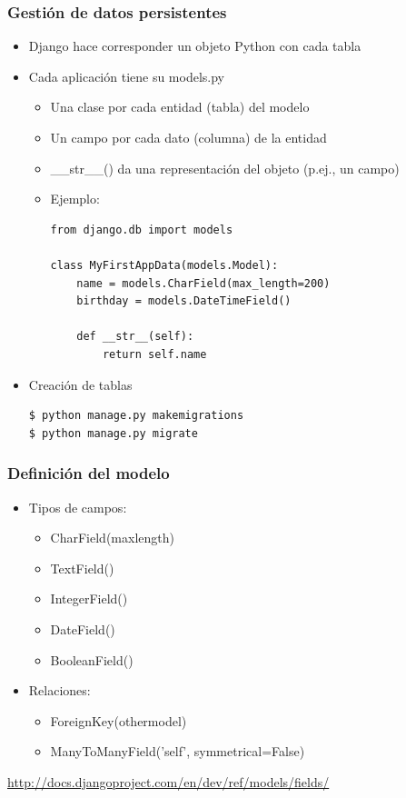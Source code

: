 \begin{frame}[fragile]
\frametitle{Gestión de datos persistentes}

\begin{itemize}
\item Django hace corresponder un objeto Python con cada tabla
\item Cada aplicación tiene su models.py
  \begin{itemize}
  \item Una clase por cada entidad (tabla) del modelo
  \item Un campo por cada dato (columna) de la entidad
  \item \_\_str\_\_() da una representación del objeto (p.ej., un campo)
  \item Ejemplo:
\begin{verbatim}
from django.db import models

class MyFirstAppData(models.Model):
    name = models.CharField(max_length=200)
    birthday = models.DateTimeField()
    
    def __str__(self):
        return self.name
\end{verbatim}
  \end{itemize}
\item Creación de tablas
\begin{verbatim}
$ python manage.py makemigrations
$ python manage.py migrate
\end{verbatim}
\end{itemize}

\end{frame}


\begin{frame}
\frametitle{Definición del modelo}

\begin{itemize}
\item Tipos de campos:
  \begin{itemize}
  \item CharField(maxlength)
  \item TextField()
  \item IntegerField()
  \item DateField()
  \item BooleanField()
  \end{itemize}
\item Relaciones:
  \begin{itemize}
  \item ForeignKey(othermodel)
  \item ManyToManyField('self', symmetrical=False)
  \end{itemize}
\end{itemize}
\begin{flushright}
\url{http://docs.djangoproject.com/en/dev/ref/models/fields/}
\end{flushright}

\end{frame}

